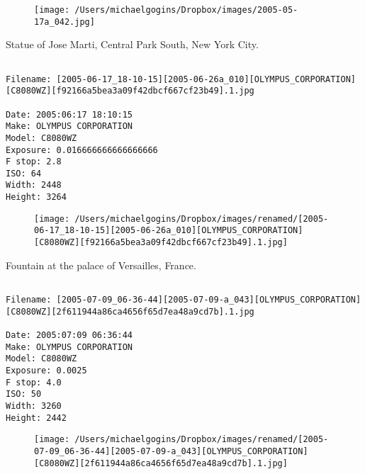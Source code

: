 \documentclass[11pt,letter,DIV=14,paper=landscape]{scrbook}
\begin{document}
\begin{figure}
\texttt{[image: /Users/michaelgogins/Dropbox/images/2005-05-17a\_042.jpg]}
\end{figure}
    
\clearpage
\noindent Statue of Jose Marti, Central Park South, New York City.
\noindent
\begin{lstlisting}

Filename: [2005-06-17_18-10-15][2005-06-26a_010][OLYMPUS_CORPORATION][C8080WZ][f92166a5bea3a09f42dbcf667cf23b49].1.jpg

Date: 2005:06:17 18:10:15
Make: OLYMPUS CORPORATION
Model: C8080WZ
Exposure: 0.016666666666666666
F stop: 2.8
ISO: 64
Width: 2448
Height: 3264
\end{lstlisting}
\clearpage

\begin{figure}
\texttt{[image: /Users/michaelgogins/Dropbox/images/renamed/[2005-06-17\_18-10-15][2005-06-26a\_010][OLYMPUS\_CORPORATION][C8080WZ][f92166a5bea3a09f42dbcf667cf23b49].1.jpg]}
\end{figure}
    
\clearpage
\noindent Fountain at the palace of Versailles, France.
\noindent
\begin{lstlisting}

Filename: [2005-07-09_06-36-44][2005-07-09-a_043][OLYMPUS_CORPORATION][C8080WZ][2f611944a86ca4656f65d7ea48a9cd7b].1.jpg

Date: 2005:07:09 06:36:44
Make: OLYMPUS CORPORATION
Model: C8080WZ
Exposure: 0.0025
F stop: 4.0
ISO: 50
Width: 3260
Height: 2442
\end{lstlisting}
\clearpage

\begin{figure}
\texttt{[image: /Users/michaelgogins/Dropbox/images/renamed/[2005-07-09\_06-36-44][2005-07-09-a\_043][OLYMPUS\_CORPORATION][C8080WZ][2f611944a86ca4656f65d7ea48a9cd7b].1.jpg]}
\end{figure}
    
\end{document}
